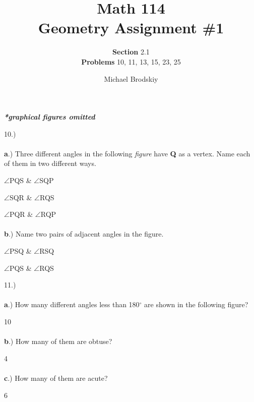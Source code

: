 \documentclass[12pt]{article}
\title{Math 114 \\ Geometry Assignment \#1}
\date{}
\subtitle{\textbf{Section} 2.1\\\textbf{Problems} 10, 11, 13, 15, 23, 25}
\author{Michael Brodskiy}
\begin{document}
\maketitle
\begin{center} \textbf{\textit{*graphical figures omitted}} \end{center} 
{\setlength{\parindent}{0cm}
10.)\paragraph{}\textbf{a}.) Three different angles in the following \textit{figure} have \textbf{Q} as a vertex. Name each of them in two different ways.
\begin{center}$\angle$\textsc{PQS} \& $\angle$\textsc{SQP}\end{center} 
\begin{center}$\angle$\textsc{SQR} \& $\angle$\textsc{RQS}\end{center}
\begin{center}$\angle$\textsc{PQR} \& $\angle$\textsc{RQP}\end{center} 
\paragraph{}\textbf{b}.) Name two pairs of adjacent angles in the figure. 
\begin{center}$\angle$\textsc{PSQ} \& $\angle$\textsc{RSQ}\end{center}
\begin{center}$\angle$\textsc{PQS} \& $\angle$\textsc{RQS}\end{center} 
}
{\setlength{\parindent}{0cm}
11.)\paragraph{}\textbf{a}.) How many different angles less than 180$^{\circ}$ are shown in the following figure? \begin{center} 10 \end{center}
\paragraph{}\textbf{b}.) How many of them are obtuse? \begin{center} 4 \end{center}
\paragraph{}\textbf{c}.) How many of them are acute? \begin{center} 6 \end{center}
}
\end{document}
